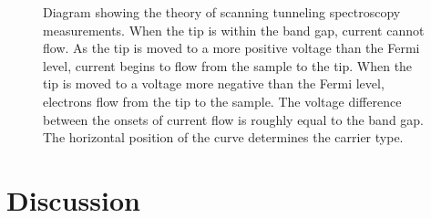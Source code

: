 \documentclass[12pt,%
              twoside,
               letterpaper]{uiothesis}
\begin{document}
\begin{figure}
		\caption[Theory of scanning tunneling spectroscopy measurements]{%
			Diagram showing the theory of scanning tunneling spectroscopy 
			measurements. When the tip is within the band gap, current cannot
			 flow. As the tip is moved to a more positive voltage than the 
			 Fermi level, current begins to flow from the sample to the tip. 
			 When the tip is moved to a voltage more negative than the Fermi 
			 level, electrons flow from the tip to the sample. The voltage 
			 difference between the onsets of current flow is roughly equal 
			 to the band gap. The horizontal position of the curve determines 
			 the carrier type.}
	\label{fig:stsdiagram}
\end{figure}

\section{Discussion}\label{sec:ch7discussion}
\end{document}
